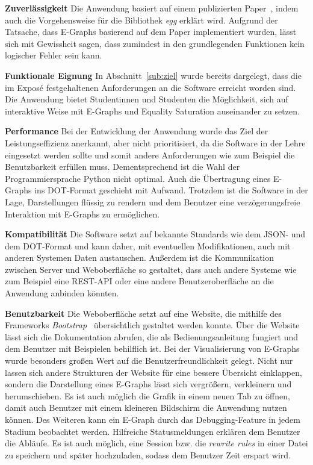 \noindent\textbf{Zuverlässigkeit} Die Anwendung basiert auf einem publizierten Paper~\cite{2021-egg}, indem auch die Vorgehensweise für die Bibliothek \textit{egg} erklärt wird.
Aufgrund der Tatsache, dass E-Graphs basierend auf dem Paper implementiert wurden, lässt sich mit Gewissheit sagen, dass zumindest in den grundlegenden Funktionen kein logischer Fehler sein kann.



\noindent\textbf{Funktionale Eignung} In Abschnitt~\ref{sub:ziel} wurde bereits dargelegt, dass die im Exposé festgehaltenen Anforderungen an die Software erreicht worden sind.
Die Anwendung bietet Studentinnen und Studenten die Möglichkeit, sich auf interaktive Weise mit E-Graphs und Equality Saturation auseinander zu setzen.





\noindent\textbf{Performance} Bei der Entwicklung der Anwendung wurde das Ziel der Leistungseffizienz anerkannt, aber nicht prioritisiert, da die Software in der Lehre eingesetzt werden sollte
und somit andere Anforderungen wie zum Beispiel die Benutzbarkeit erfüllen muss. Dementsprechend ist die Wahl der Programmiersprache Python nicht optimal. Auch die Übertragung eines E-Graphs ins DOT-Format 
geschieht mit Aufwand. Trotzdem ist die Software in der Lage, Darstellungen flüssig zu rendern und dem Benutzer eine verzögerungsfreie Interaktion mit E-Graphs zu ermöglichen.

\noindent\textbf{Kompatibilität} Die Software setzt auf bekannte Standards wie dem JSON- und dem DOT-Format und kann daher, mit eventuellen Modifikationen, auch mit anderen Systemen Daten austauschen.
Außerdem ist die Kommunikation zwischen Server und Weboberfläche so gestaltet, dass auch andere Systeme wie zum Beispiel eine REST-API oder eine andere Benutzeroberfläche an die Anwendung anbinden könnten.

\noindent\textbf{Benutzbarkeit} Die Weboberfläche setzt auf eine Website, die mithilfe des Frameworks \textit{Bootstrap}~\cite{bootstrap} übersichtlich gestaltet werden konnte.
Über die Website lässt sich die Dokumentation abrufen, die als Bedienungsanleitung fungiert und dem Benutzer mit Beispielen behilflich ist.
Bei der Visualisierung von E-Graphs wurde besonders großen Wert auf die Benutzerfreundlichkeit gelegt. Nicht nur lassen sich andere Strukturen der Website für eine bessere Übersicht 
einklappen, sondern die Darstellung eines E-Graphs lässt sich vergrößern, verkleinern und herumschieben. Es ist auch möglich die Grafik in einem neuen Tab zu öffnen, damit auch Benutzer
mit einem kleineren Bildschirm die Anwendung nutzen können.
Des Weiteren kann ein E-Graph durch das Debugging-Feature in jedem Stadium beobachtet werden. Hilfreiche Statusmeldungen erklären dem Benutzer die Abläufe.
Es ist auch möglich, eine Session bzw. die \textit{rewrite rules} in einer Datei zu speichern und später hochzuladen, sodass dem Benutzer Zeit erspart wird.
